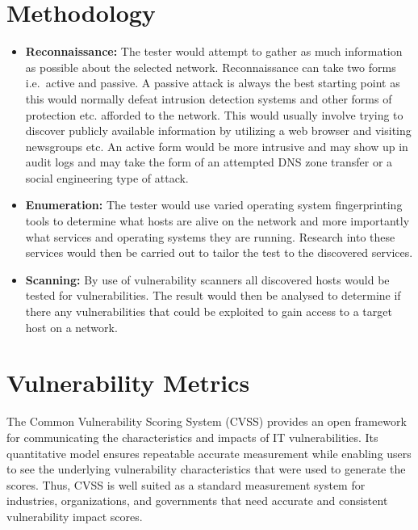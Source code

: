 

  \section{Methodology}\label{sec:methodology-utilized}

    \begin{itemize}
      \item \textbf{Reconnaissance:}
        The tester would attempt to gather as much information as possible about
        the selected network. Reconnaissance can take two forms i.e.~active and
        passive. A passive attack is always the best starting point as this
        would normally defeat intrusion detection systems and other forms of
        protection etc. afforded to the network. This would usually involve
        trying to discover publicly available information by utilizing a web
        browser and visiting newsgroups etc. An active form would be more
        intrusive and may show up in audit logs and may take the form of an
        attempted DNS zone transfer or a social engineering type of attack.
      \item \textbf{Enumeration:}
        The tester would use varied operating system fingerprinting tools to
        determine what hosts are alive on the network and more importantly what
        services and operating systems they are running. Research into these
        services would then be carried out to tailor the test to the discovered
        services.
      \item \textbf{Scanning:}
        By use of vulnerability scanners all discovered hosts would be tested
        for vulnerabilities. The result would then be analysed to determine if
        there any vulnerabilities that could be exploited to gain access to a
        target host on a network.
    \end{itemize}

  \section{Vulnerability Metrics}\label{sec:vulnerability-metrics}

    The Common Vulnerability Scoring System (CVSS) provides an open
    framework for communicating the characteristics and impacts of IT
    vulnerabilities. Its quantitative model ensures repeatable accurate
    measurement while enabling users to see the underlying vulnerability
    characteristics that were used to generate the scores. Thus, CVSS is
    well suited as a standard measurement system for industries,
    organizations, and governments that need accurate and consistent
    vulnerability impact scores.

